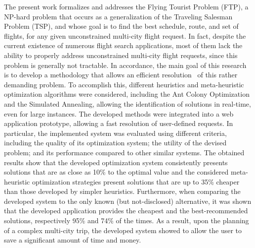 The present work formalizes and addresses the Flying Tourist Problem (FTP), a NP-hard problem that occurs as a generalization of the Traveling Salesman Problem (TSP), and whose goal is to find the best schedule, route, and set of flights, for any given unconstrained multi-city flight request. In fact, despite the current existence of numerous flight search applications, most of them lack the ability to  properly address unconstrained multi-city flight requests, since this problem is generally not tractable. In accordance, the main goal of this research is to develop a methodology that allows an efficient resolution 
of this rather demanding problem. To accomplish this, different heuristics and meta-heuristic optimization algorithms were considered, including the Ant Colony Optimization and the Simulated Annealing, allowing the identification of solutions in real-time, even for large instances. The developed methods were integrated into a web application prototype, allowing a fast resolution of user-defined requests. In particular, the implemented system was evaluated using different criteria, including the quality of its optimization system; the utility of the devised problem; and its performance compared to other similar systems. The obtained results show that the developed optimization system consistently presents solutions that are as close as 10\% to the optimal value and the considered meta-heuristic optimization strategies present solutions that are up to 35\% cheaper than those developed by simpler heuristics. Furthermore, when comparing the developed system to  the only known (but not-disclosed) alternative, it was shown that the developed application provides the cheapest and the best-recommended solutions, respectively 95\% and 74\% of the times. As a result, upon  the planning of a complex multi-city trip, the developed system showed to allow the user to save a significant amount of time and money.


